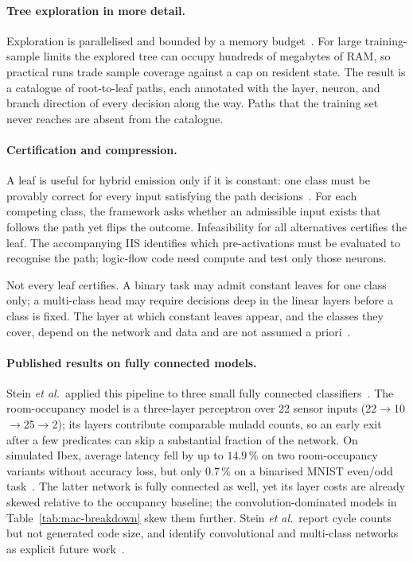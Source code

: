 \paragraph{Tree exploration in more detail.}
Exploration is parallelised and bounded by a memory budget~\cite{stein2026nn2logic}.
For large training-sample limits the explored tree can occupy hundreds of megabytes of RAM, so practical runs trade sample coverage against a cap on resident state.
The result is a catalogue of root-to-leaf paths, each annotated with the layer, neuron, and branch direction of every decision along the way.
Paths that the training set never reaches are absent from the catalogue.

\paragraph{Certification and compression.}
A leaf is useful for hybrid emission only if it is constant: one class must be provably correct for every input satisfying the path decisions~\cite{stein2026nn2logic}.
For each competing class, the framework asks whether an admissible input exists that follows the path yet flips the outcome.
Infeasibility for all alternatives certifies the leaf.
The accompanying \ac{IIS} identifies which pre-activations must be evaluated to recognise the path; logic-flow code need compute and test only those neurons.

Not every leaf certifies.
A binary task may admit constant leaves for one class only; a multi-class head may require decisions deep in the linear layers before a class is fixed.
The layer at which constant leaves appear, and the classes they cover, depend on the network and data and are not assumed a priori~\cite{stein2026nn2logic}.

\paragraph{Published results on fully connected models.}
Stein \textit{et al.}\ applied this pipeline to three small fully connected classifiers~\cite{stein2026nn2logic}.
The room-occupancy model is a three-layer perceptron over 22 sensor inputs (22\(\rightarrow\)10\(\rightarrow\)25\(\rightarrow\)2); its layers contribute comparable muladd counts, so an early exit after a few predicates can skip a substantial fraction of the network.
On simulated Ibex, average latency fell by up to \(14.9\,\%\) on two room-occupancy variants without accuracy loss, but only \(0.7\,\%\) on a binarised MNIST even/odd task~\cite{deng2012mnist,stein2026nn2logic}.
The latter network is fully connected as well, yet its layer costs are already skewed relative to the occupancy baseline; the convolution-dominated models in Table~\ref{tab:mac-breakdown} skew them further.
Stein \textit{et al.}\ report cycle counts but not generated code size, and identify convolutional and multi-class networks as explicit future work~\cite{stein2026nn2logic}.


